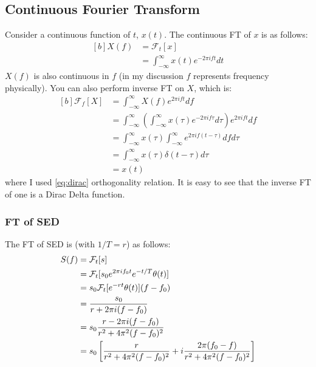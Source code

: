 \documentclass[letterpaper, 11pt]{article}
\newcommand{\fourier}[2]{\mathcal{F}_{#1}[#2]} %
\newcommand{\fint}{\int_{-\infty}^{\infty}} %
\newcommand{\ft}[2]{\fint #2 e^{-2\pi if#1} d#1} %
\newcommand{\ift}[2]{\fint #2 e^{2\pi i#1t} d#1} %
\newcommand{\sed}[1]{s_{0}e^{2\pi if_{0}#1}e^{-#1/T}} %
\numberwithin{equation}{section}
\numberwithin{figure}{section}
\begin{document}
\subsection{Continuous Fourier Transform}
Consider a continuous function of \(t\), \(x(t)\). The continuous FT of \(x\) is as follows:
\begin{equation}
	\begin{aligned}[b]
		X(f)	&=\fourier{t}{x} \\
			&=\ft{t}{x(t)}
	\end{aligned}
\end{equation}
\(X(f)\) is also continuous in \(f\) (in my discussion \(f\) represents frequency physically). You can also perform inverse FT on \(X\), which is:
\begin{equation}
	\begin{aligned}[b]
		\fourier{f}{X}	&= \ift{f}{X(f)} \\
				&= \ift{f}{\left ( \ft{\tau}{x(\tau)}\right )} \\
				&= \fint x(\tau) \fint e^{2\pi if(t - \tau)} df d\tau \\
				&= \fint x(\tau) \delta (t - \tau) d\tau \\
				&= x(t)
	\end{aligned}
\end{equation}
where I used \eqref{eq:dirac} orthogonality relation. It is easy to see that the inverse FT of one is a Dirac Delta function.

\subsubsection{FT of SED}
The FT of SED is (with \(1/T = r\)) as follows:
\begin{equation}
	\begin{aligned}[b]
		S(f)	&= \fourier{t}{s}\\
			&= \fourier{t}{\sed{t} \theta (t)}\\
			&= s_{0}\fourier{t}{e^{-rt} \theta (t)}(f - f_{0})\\
			&= \frac{s_{0}}{r + 2\pi i(f - f_{0})} \\
			\gdef\temp{r^2 + 4\pi^{2}(f - f_{0})^2} %
			&= s_{0}\frac{r - 2\pi i(f - f_{0})}{\temp}\\
			&= s_{0}\left[\frac{r}{\temp} + i\frac{2\pi(f_{0} - f)}{\temp} \right]
	\end{aligned}
\end{equation}
\printindex
\end{document}
